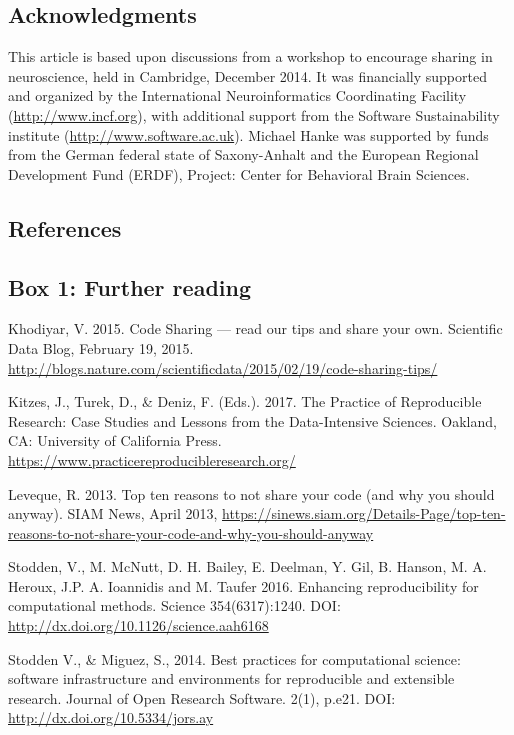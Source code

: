 \documentclass[11pt]{article}
\begin{document}
\subsection*{Acknowledgments}

This article is based upon discussions from a workshop to encourage
sharing in neuroscience, held in Cambridge, December 2014.  It was
financially supported and organized by the International
Neuroinformatics Coordinating Facility (\url{http://www.incf.org}),
with additional support from the Software Sustainability institute
(\url{http://www.software.ac.uk}).
%
Michael Hanke was supported by funds from the German federal state of
Saxony-Anhalt and the European Regional Development Fund (ERDF), Project:
Center for Behavioral Brain Sciences.


\subsection*{References}

\printbibliography


\clearpage

\subsection*{Box 1: Further reading}

Khodiyar, V. 2015. Code Sharing --- read our tips and share your own. Scientific Data Blog, February 19, 2015. \url{http://blogs.nature.com/scientificdata/2015/02/19/code-sharing-tips/}

Kitzes, J., Turek, D., \& Deniz, F. (Eds.). 2017. The Practice of Reproducible Research: Case Studies and Lessons from the Data-Intensive Sciences. Oakland, CA: University of California Press. \url{https://www.practicereproducibleresearch.org/}

Leveque, R. 2013. Top ten reasons to not share your code (and why you
should anyway). SIAM News, April 2013, \url{https://sinews.siam.org/Details-Page/top-ten-reasons-to-not-share-your-code-and-why-you-should-anyway}


Stodden, V., M. McNutt, D. H. Bailey, E. Deelman, Y. Gil, B. Hanson, M. A. Heroux, J.P. A. Ioannidis and M. Taufer 2016. Enhancing reproducibility for computational methods. Science 354(6317):1240.  DOI: \url{http://dx.doi.org/10.1126/science.aah6168}

Stodden V., \& Miguez, S., 2014. Best practices for computational science: software infrastructure and environments for reproducible and extensible research. Journal of Open Research Software. 2(1), p.e21. DOI: \url{http://dx.doi.org/10.5334/jors.ay}
\end{document}
